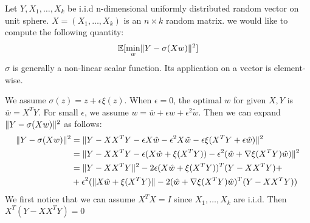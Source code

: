 \documentclass{article}
\DeclarePairedDelimiter\norm{\lVert}{\rVert}
\def\E{\mathbb{E}}
\begin{document}
Let $Y, X_1, \dots, X_k$ be i.i.d n-dimensional uniformly distributed random vector on unit sphere. $X=(X_1, \dots, X_k)$ is an $n\times k$ random matrix. we would like to compute the following quantity:
\begin{equation}
\E[\min_w \norm{Y - \sigma (X w ) }^2]
\end{equation}
$\sigma$ is generally a non-linear scalar function. Its application on a vector is element-wise.

We assume $\sigma(z) = z + \epsilon \xi(z)$. When $\epsilon = 0$, the optimal $w$ for given $X, Y$ is 
$\bar{w} = X^T Y $. For small $\epsilon$, we assume $ w = \bar{w} + \epsilon \hat{w} + \epsilon^2 \tilde{w}$. Then we can expand $\norm{Y - \sigma (X w ) }^2$ as follows:
\begin{align*}
\norm{Y - \sigma (X w ) }^2 & = \norm{Y - XX^T Y - \epsilon X \hat{w} - \epsilon^2 X \tilde{w} - \epsilon \xi(X^T Y + \epsilon \hat{w}) }^2 \\
& = \norm{ Y - XX^T Y - \epsilon (X\hat{w} + \xi(X^T Y)) - \epsilon^2(\hat{w} + \nabla \xi(X^TY)\hat{w})}^2 \\
& = \norm{Y-XX^T Y }^2 - 2 \epsilon (X \hat{w} + \xi(X^TY))^T (Y-XX^TY) +\\
& +\epsilon^2(\norm{X\hat{w} + \xi(X^TY)} - 2 (\hat{w} + \nabla \xi(X^TY)\hat{w})^T(Y-XX^TY))
\end{align*}
We first notice that we can assume $X^T X = I$ since $X_1, \dots, X_k$ are i.i.d.
Then $X^T(Y-XX^TY) = 0$
\end{document}

